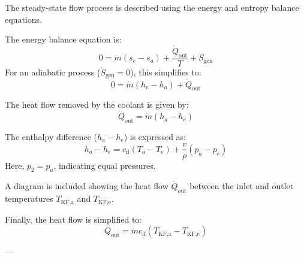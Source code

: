 The steady-state flow process is described using the energy and entropy balance equations.  

The energy balance equation is:  
\[
0 = \dot{m}(s_e - s_a) + \frac{\dot{Q}_{\text{out}}}{T} + \dot{S}_{\text{gen}}
\]  
For an adiabatic process (\( \dot{S}_{\text{gen}} = 0 \)), this simplifies to:  
\[
0 = \dot{m}(h_e - h_a) + \dot{Q}_{\text{out}}
\]  

The heat flow removed by the coolant is given by:  
\[
\dot{Q}_{\text{out}} = \dot{m}(h_a - h_e)
\]  

The enthalpy difference (\( h_a - h_e \)) is expressed as:  
\[
h_a - h_e = c_{\text{if}}(T_a - T_e) + \frac{v}{\rho}(p_a - p_e)
\]  
Here, \( p_2 = p_a \), indicating equal pressures.  

A diagram is included showing the heat flow \( \dot{Q}_{\text{out}} \) between the inlet and outlet temperatures \( T_{\text{KF,a}} \) and \( T_{\text{KF,e}} \).  

Finally, the heat flow is simplified to:  
\[
\dot{Q}_{\text{out}} = \dot{m} c_{\text{if}} (T_{\text{KF,a}} - T_{\text{KF,e}})
\]  

---